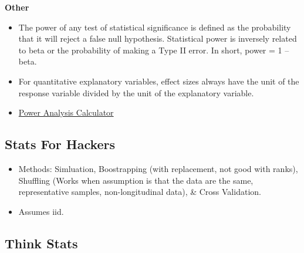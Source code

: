 \documentclass[]{book}
\theoremstyle{definition}
\theoremstyle{definition}
\theoremstyle{definition}
\theoremstyle{remark}
\begin{document}
\textbf{Other}

\begin{itemize}
\item
  The power of any test of statistical significance is defined as the
  probability that it will reject a false null hypothesis. Statistical
  power is inversely related to beta or the probability of making a Type
  II error. In short, power = 1 -- beta.
\item
  For quantitative explanatory variables, effect sizes always have the
  unit of the response variable divided by the unit of the explanatory
  variable.
\item
  \href{http://www.evanmiller.org/ab-testing/sample-size.html}{Power
  Analysis Calculator}
\end{itemize}

\subsection{Stats For Hackers}\label{stats-for-hackers}

\begin{itemize}
\item
  Methods: Simluation, Boostrapping (with replacement, not good with
  ranks), Shuffling (Works when assumption is that the data are the
  same, representative samples, non-longitudinal data), \& Cross
  Validation.
\item
  Assumes iid.
\end{itemize}

\subsection{Think Stats}\label{think-stats}
\end{document}
